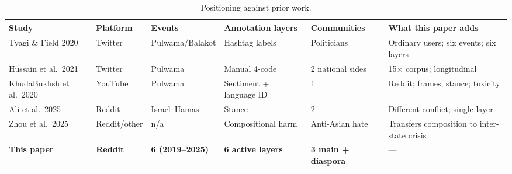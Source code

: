 \begin{table}[t]
  \caption{Positioning against prior work.}
  \label{tab:positioning}
  \footnotesize
  \begin{tabular}{@{}p{2.1cm}p{1.4cm}p{1.9cm}p{2.3cm}p{1.9cm}p{3.6cm}@{}}
    \toprule
    Study & Platform & Events & Annotation layers & Communities & What this paper adds \\
    \midrule
    Tyagi \& Field 2020 & Twitter & Pulwama/Balakot & Hashtag labels & Politicians & Ordinary users; six events; six layers \\
    Hussain et al.\ 2021 & Twitter & Pulwama & Manual 4-code & 2 national sides & 15$\times$ corpus; longitudinal \\
    KhudaBukhsh et al.\ 2020 & YouTube & Pulwama & Sentiment + language ID & 1 & Reddit; frames; stance; toxicity \\
    Ali et al.\ 2025 & Reddit & Israel--Hamas & Stance & 2 & Different conflict; single layer \\
    Zhou et al.\ 2025 & Reddit/other & n/a & Compositional harm & Anti-Asian hate & Transfers composition to inter-state crisis \\
    \textbf{This paper} & \textbf{Reddit} & \textbf{6 (2019--2025)} & \textbf{6 active layers} & \textbf{3 main + diaspora} & --- \\
    \bottomrule
  \end{tabular}
\end{table}
